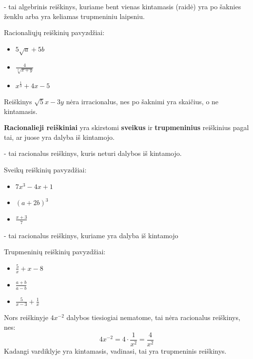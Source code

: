 \documentclass[11pt,a4paper]{scrartcl}
\begin{document}
\begin{definition}
     - tai algebrinis reiškinys, kuriame bent vienas kintamasis (raidė) yra po šaknies ženklu arba yra keliamas trupmeniniu laipsniu.
\end{definition}
\begin{example}
Racionaliųjų reiškinių pavyzdžiai:
    \begin{itemize}
        \item $5\sqrt{a}+5b $
        \item $ \frac{4}{\sqrt[3]{x+y} }  $
        \item $x ^{\frac{1}{3}} +4x-5   $ 
    \end{itemize}
\end{example}
\begin{remark}
    Reiškinys $\sqrt{5}x-3y$ nėra irracionalus, nes po šaknimi yra skaičius, o ne kintamasis.
\end{remark}

\textbf{Racionalieji reiškiniai} yra skirstomi \textbf{sveikus} ir \textbf{trupmeninius} reiškinius pagal tai, ar juose yra dalyba iš kintamojo.


\begin{definition}
     - tai racionalus reiškinys, kuris neturi dalybos iš kintamojo.
\end{definition}

\begin{example}
Sveikų reiškinių pavyzdžiai:
    \begin{itemize}
        \item $7x ^{3} -4x+1$
        \item $(a+2b) ^{3} $
        \item $\frac{x+3}{7} $ 
    \end{itemize}
\end{example}

\begin{definition}
     - tai racionalus reiškinys, kuriame yra dalyba iš kintamojo
\end{definition}

\begin{example}
Trupmeninių reiškinių pavyzdžiai:
    \begin{itemize}
        \item $\frac{5}{x}+x-8$
        \item $\frac{a+b}{a-b}  $
        \item $\frac{5}{x-3}+ \frac{1}{x}  $ 
    \end{itemize}
\end{example}
\begin{remark}
    Nors reiškinyje $4x^{-2} $ dalybos tiesiogiai nematome, tai nėra racionalus reiškinys, nes:
    $$4x ^{-2} = 4 \cdot \frac{1}{x ^{2} }  = \frac{4}{x ^{2} }   $$
    Kadangi vardiklyje yra kintamasis, vadinasi, tai yra trupmeninis reiškinys.
\end{remark}
\end{document}
